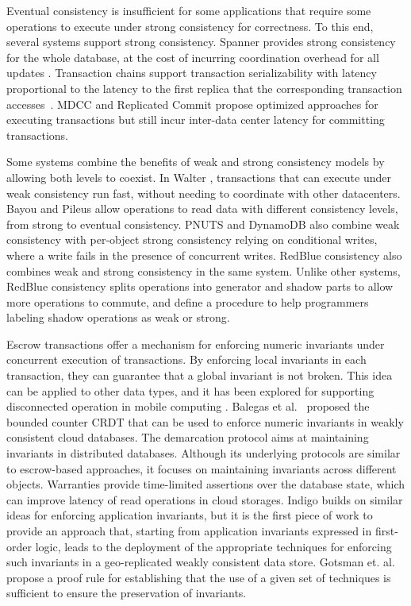 \documentclass[11pt,dvipdfm]{article}
\begin{document}
Eventual consistency is insufficient for some applications that require
some operations to execute under strong consistency for correctness.
To this end, several systems support strong consistency.
Spanner provides strong consistency for the whole database, at the cost
of incurring coordination overhead for all updates  \cite{spanner}.
Transaction chains support transaction serializability with latency
proportional to the latency to the first replica that the corresponding transaction accesses~\cite{transactionchains}.
MDCC \cite{mdcc} and Replicated Commit \cite{replicatedcommit} propose optimized approaches for executing transactions but still incur inter-data center latency for committing transactions.

Some systems combine the benefits of weak and strong consistency models by allowing both levels to coexist.
In Walter \cite{walter}, transactions that can execute under weak consistency run fast, without needing to coordinate with other datacenters.
Bayou \cite{bayou} and Pileus \cite{Pileus} allow operations to read data with different consistency levels, from strong to eventual consistency.
PNUTS \cite{pnuts} and DynamoDB \cite{dynamoDB} also combine weak consistency with per-object strong consistency relying on conditional writes, where a write fails in the presence of concurrent writes.
RedBlue consistency also combines weak and strong consistency in the same system.
Unlike other systems, RedBlue consistency splits operations into
generator and shadow parts to allow more
operations to commute, and define a procedure to help programmers labeling shadow operations
as weak or strong.

Escrow transactions \cite{ONeil1986Escrow} offer a mechanism for
enforcing numeric invariants under concurrent execution of transactions.
By enforcing local invariants in each transaction, they can guarantee that a
global invariant is not broken.
This  idea can be applied to other data types, and it has been
explored for supporting disconnected operation
in mobile computing \cite{Walborn95Semantics,mobisnap,exo-leasing}.
Balegas et al.~\cite{Balegas2015Counter} proposed the bounded counter CRDT
that can be used to enforce numeric invariants in weakly consistent cloud
databases.
The demarcation protocol \cite{BarbaraMilla1994Demarcation} aims at maintaining invariants
in distributed databases.
Although its underlying protocols are similar to escrow-based
approaches, it focuses on maintaining invariants across different objects.
Warranties \cite{warranties} provide time-limited assertions over the database state, which can improve latency of read operations in cloud storages.
Indigo builds on similar ideas for enforcing application invariants,
but it is the first piece of work
to provide an approach that, starting from application invariants expressed in first-order
logic, leads to the deployment of the appropriate techniques for enforcing such
invariants in a geo-replicated weakly consistent data store.
Gotsman et. al. \cite{GotsmanConsistencyReason} propose a proof rule
for establishing that the use of a given set of techniques is
sufficient to ensure the preservation of invariants.
\end{document}
